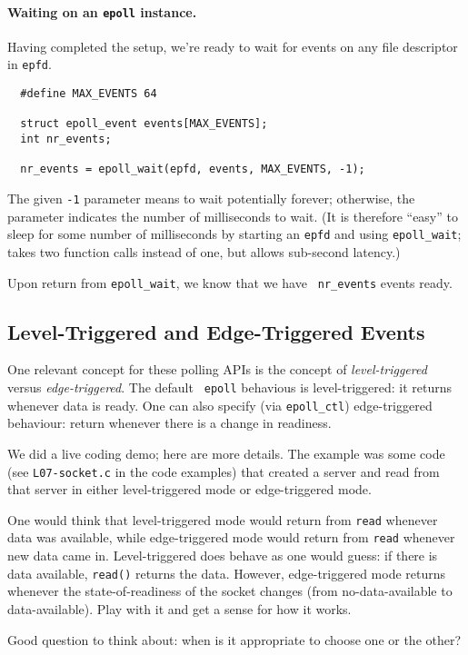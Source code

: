 \documentclass[11pt]{article}
\begin{document}
\paragraph{Waiting on an {\tt epoll} instance.} Having completed
the setup, we're ready to wait for events on any file descriptor in {\tt epfd}.
    \begin{lstlisting}
  #define MAX_EVENTS 64

  struct epoll_event events[MAX_EVENTS];
  int nr_events;

  nr_events = epoll_wait(epfd, events, MAX_EVENTS, -1);
    \end{lstlisting}

The given {\tt -1} parameter means to wait potentially forever;
otherwise, the parameter indicates the number of milliseconds to wait.
(It is therefore ``easy'' to sleep for some number of milliseconds by
starting an {\tt epfd} and using {\tt epoll\_wait}; takes two function
calls instead of one, but allows sub-second latency.)

Upon return from {\tt epoll\_wait}, we know that we have {\tt
  nr\_events} events ready.

\subsection*{Level-Triggered and Edge-Triggered Events}
One relevant concept for these polling APIs is the concept of
\emph{level-triggered} versus \emph{edge-triggered}.  The default {\tt
  epoll} behavious is level-triggered: it returns whenever data is
ready. One can also specify (via {\tt epoll\_ctl}) edge-triggered
behaviour: return whenever there is a change in readiness.

We did a live coding demo; here are more details. The example was some code
(see {\tt L07-socket.c} in the code examples) that created a server and
read from that server in either level-triggered mode or edge-triggered
mode. 

One would think that level-triggered mode would return from {\tt read}
whenever data was available, while edge-triggered mode would return
from {\tt read} whenever new data came in. Level-triggered does behave
as one would guess: if there is data available, {\tt read()} returns
the data. However, edge-triggered mode returns whenever the
state-of-readiness of the socket changes (from no-data-available to
data-available). Play with it and get a sense for how it works.

Good question to think about: when is it appropriate to choose one or the other?
\end{document}
